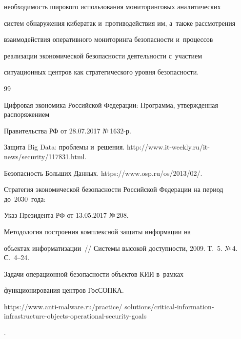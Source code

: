 необходимость широкого использования мониторинговых аналитических 

систем обнаружения кибератак и~противодействия им, а~также рас\-смот\-ре\-ния 

взаимодействия оперативного мониторинга без\-опас\-ности и~процессов 

реализации экономической без\-опас\-ности деятельности с~участием 

ситуационных цент\-ров как стратегического уровня без\-опас\-ности.

  

{\small\frenchspacing

{%


\begin{thebibliography}{99}


Цифровая экономика Российской Федерации: Программа, утвержденная распоряжением 

Правительства РФ от 28.07.2017 №\,1632-р.


Защита Big Data: проблемы и~решения. {\sf http://www.it-weekly.ru/it-news/\linebreak security/117831.html}. 


 Безопасность Больших Данных. {\sf https://www.osp.ru/os/2013/02/}. 


Стратегия экономической безопасности Российской Федерации на период до~2030~года: 

Указ Президента РФ от 13.05.2017 №\,208.


 Методология построения комплексной защиты информации на 

объектах информатизации~/\!\!/ Системы высокой доступности, 2009. Т.~5. №\,4. С.~4--24.


 Задачи операционной безопасности объектов КИИ в~рамках 

функционирования центров ГосСОПКА. {\sf  

https://www.anti-malware.ru/practice/ solutions/critical-information-infrastructure-objects-operational-security-goals}. 




\end{thebibliography}}}
